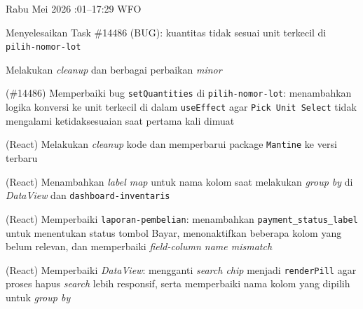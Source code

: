 \begin{logtable}
    {
        Rabu  Mei 2026 :01--17:29 \linebreak %
        WFO
    }{
        \begin{loglist}
            \item Menyelesaikan Task \#14486 (BUG): kuantitas tidak sesuai unit terkecil di
            \texttt{pilih-nomor-lot}
            \item Melakukan \textit{cleanup} dan berbagai perbaikan \textit{minor}
        \end{loglist}
    }{
        \begin{logwork}
            \item (\#14486) Memperbaiki bug \texttt{setQuantities} di \texttt{pilih-nomor-lot}: menambahkan logika konversi ke unit terkecil di dalam \texttt{useEffect} agar \texttt{Pick Unit Select} tidak mengalami ketidaksesuaian saat pertama kali dimuat
            \item (React) Melakukan \textit{cleanup} kode dan memperbarui package \texttt{Mantine} ke versi terbaru
            \item (React) Menambahkan \textit{label map} untuk nama kolom saat melakukan \textit{group by} di \textit{DataView} dan \texttt{dashboard-inventaris}
            \item (React) Memperbaiki \texttt{laporan-pembelian}: menambahkan \texttt{payment\_status\_label} untuk menentukan status tombol Bayar, menonaktifkan beberapa kolom yang belum relevan, dan memperbaiki \textit{field-column name mismatch}
            \item (React) Memperbaiki \textit{DataView}: mengganti \textit{search chip} menjadi \texttt{renderPill} agar proses hapus \textit{search} lebih responsif, serta memperbaiki nama kolom yang dipilih untuk \textit{group by}
        \end{logwork}
    }


\end{logtable}
